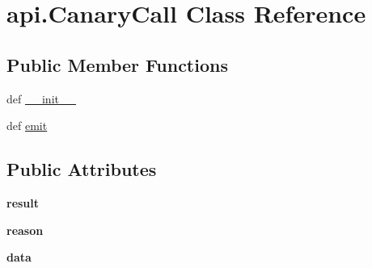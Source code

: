 \hypertarget{classapi_1_1_canary_call}{\section{api.\-Canary\-Call Class Reference}
\label{classapi_1_1_canary_call}
}
\subsection*{Public Member Functions}
\begin{DoxyCompactItemize}
\item 
def \hyperlink{classapi_1_1_canary_call_ac588d521c86e5fc5c12f1b3726a64c43}{\-\_\-\-\_\-init\-\_\-\-\_\-}
\item 
def \hyperlink{classapi_1_1_canary_call_a6bfc31d394a2d0009114243d157fe2ed}{emit}
\end{DoxyCompactItemize}
\subsection*{Public Attributes}
\begin{DoxyCompactItemize}
\item 
\hypertarget{classapi_1_1_canary_call_a7e92b23fd21be88cfed022b4a6939040}{{\bfseries result}}\label{classapi_1_1_canary_call_a7e92b23fd21be88cfed022b4a6939040}

\item 
\hypertarget{classapi_1_1_canary_call_a6105b29ae895263dbd460679eeca6ace}{{\bfseries reason}}\label{classapi_1_1_canary_call_a6105b29ae895263dbd460679eeca6ace}

\item 
\hypertarget{classapi_1_1_canary_call_a863215d250eb3714a11462265a04c9e3}{{\bfseries data}}\label{classapi_1_1_canary_call_a863215d250eb3714a11462265a04c9e3}

\end{DoxyCompactItemize}


